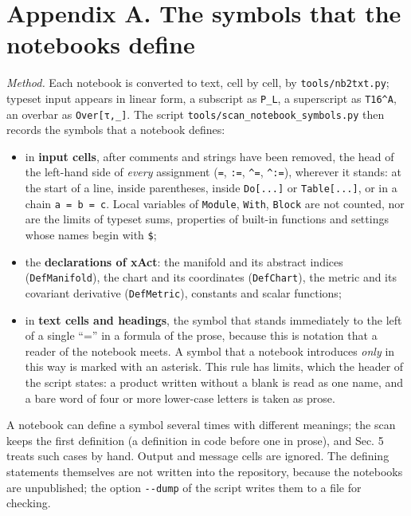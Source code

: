 \documentclass[
  10pt,
]{article}
\providecommand{\tightlist}{%
  \setlength{\itemsep}{0pt}\setlength{\parskip}{0pt}}
\begin{document}
\hypertarget{appendix-a.-the-symbols-that-the-notebooks-define}{%
\section{Appendix A. The symbols that the notebooks
define}\label{appendix-a.-the-symbols-that-the-notebooks-define}}

\emph{Method.} Each notebook is converted to text, cell by cell, by
\texttt{tools/nb2txt.py}; typeset input appears in linear form, a
subscript as \texttt{P\_L}, a superscript as \texttt{T16\^{}A}, an
overbar as \texttt{Over{[}τ,\_{]}}. The script
\texttt{tools/scan\_notebook\_symbols.py} then records the symbols that
a notebook defines:

\begin{itemize}
\tightlist
\item
  in \textbf{input cells}, after comments and strings have been removed,
  the head of the left-hand side of \emph{every} assignment (\texttt{=},
  \texttt{:=}, \texttt{\^{}=}, \texttt{\^{}:=}), wherever it stands: at
  the start of a line, inside parentheses, inside \texttt{Do{[}...{]}}
  or \texttt{Table{[}...{]}}, or in a chain \texttt{a\ =\ b\ =\ c}.
  Local variables of \texttt{Module}, \texttt{With}, \texttt{Block} are
  not counted, nor are the limits of typeset sums, properties of
  built-in functions and settings whose names begin with \texttt{\$};
\item
  the \textbf{declarations of xAct}: the manifold and its abstract
  indices (\texttt{DefManifold}), the chart and its coordinates
  (\texttt{DefChart}), the metric and its covariant derivative
  (\texttt{DefMetric}), constants and scalar functions;
\item
  in \textbf{text cells and headings}, the symbol that stands
  immediately to the left of a single ``='' in a formula of the prose,
  because this is notation that a reader of the notebook meets. A symbol
  that a notebook introduces \emph{only} in this way is marked with an
  asterisk. This rule has limits, which the header of the script states:
  a product written without a blank is read as one name, and a bare word
  of four or more lower-case letters is taken as prose.
\end{itemize}

A notebook can define a symbol several times with different meanings;
the scan keeps the first definition (a definition in code before one in
prose), and Sec. 5 treats such cases by hand. Output and message cells
are ignored. The defining statements themselves are not written into the
repository, because the notebooks are unpublished; the option
\texttt{-\/-dump} of the script writes them to a file for checking.
\end{document}

